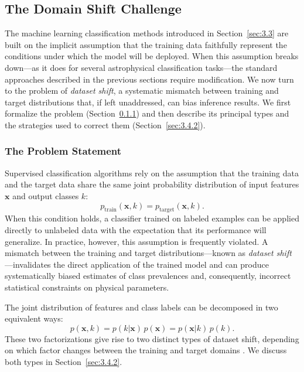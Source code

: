 \subsection{The Domain Shift Challenge}
\label{sec:3.4}

The machine learning classification methods introduced in Section~\ref{sec:3.3} are built on the implicit assumption that the training data faithfully represent the conditions under which the model will be deployed. When this assumption breaks down---as it does for several astrophysical classification tasks---the standard approaches described in the previous sections require modification. We now turn to the problem of \textit{dataset shift}, a systematic mismatch between training and target distributions that, if left unaddressed, can bias inference results. We first formalize the problem (Section~\ref{sec:3.4.1}) and then describe its principal types and the strategies used to correct them (Section~\ref{sec:3.4.2}).


\subsubsection{The Problem Statement}
\label{sec:3.4.1}

Supervised classification algorithms rely on the assumption that the training data and the target data share the same joint probability distribution of input features $\mathbf{x}$ and output classes $k$:
\begin{equation}
p_{\text{train}}(\mathbf{x}, k) = p_{\text{target}}(\mathbf{x}, k).
\label{eq:dataset_shift_assumption}
\end{equation}
When this condition holds, a classifier trained on labeled examples can be applied directly to unlabeled data with the expectation that its performance will generalize. In practice, however, this assumption is frequently violated. A mismatch between the training and target distributions---known as \textit{dataset shift} \cite{MorenoTorres:2012}---invalidates the direct application of the trained model and can produce systematically biased estimates of class prevalences and, consequently, incorrect statistical constraints on physical parameters.

The joint distribution of features and class labels can be decomposed in two equivalent ways:
\begin{equation}
p(\mathbf{x}, k) = p(k|\mathbf{x})\,p(\mathbf{x}) = p(\mathbf{x}|k)\,p(k).
\label{eq:joint_factorizations}
\end{equation}
These two factorizations give rise to two distinct types of dataset shift, depending on which factor changes between the training and target domains \cite{MorenoTorres:2012}. We discuss both types in Section~\ref{sec:3.4.2}.

